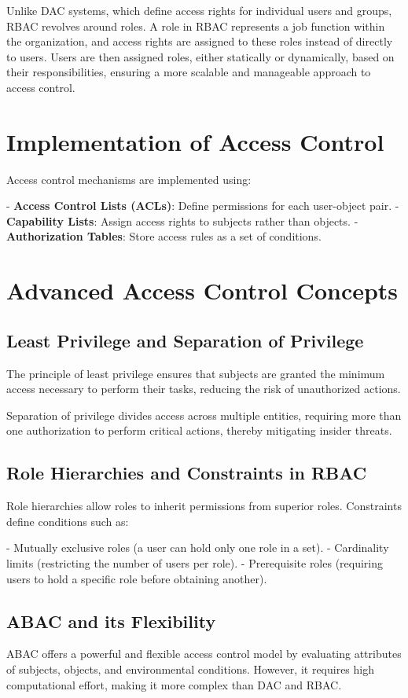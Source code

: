 Unlike DAC systems, which define access rights for individual users
and groups, RBAC revolves around roles. A role in RBAC represents a
job function within the organization, and access rights are assigned
to these roles instead of directly to users. Users are then assigned
roles, either statically or dynamically, based on their
responsibilities, ensuring a more scalable and manageable approach to
access control.

\section{Implementation of Access Control}
Access control mechanisms are implemented using:

- \textbf{Access Control Lists (ACLs)}: Define permissions for each user-object
pair.
- \textbf{Capability Lists}: Assign access rights to subjects rather than
objects.
- \textbf{Authorization Tables}: Store access rules as a set of conditions.

\section{Advanced Access Control Concepts}
\subsection{Least Privilege and Separation of Privilege}
The principle of least privilege ensures that subjects are granted the minimum
access necessary to perform their tasks, reducing the risk of unauthorized
actions.

Separation of privilege divides access across multiple entities, requiring more
than one authorization to perform critical actions, thereby mitigating insider
threats.

\subsection{Role Hierarchies and Constraints in RBAC}
Role hierarchies allow roles to inherit permissions from superior roles.
Constraints define conditions such as:

- Mutually exclusive roles (a user can hold only one role in a set).
- Cardinality limits (restricting the number of users per role).
- Prerequisite roles (requiring users to hold a specific role before obtaining
another).

\subsection{ABAC and its Flexibility}
ABAC offers a powerful and flexible access control model by evaluating
attributes of subjects, objects, and environmental conditions. However, it
requires high computational effort, making it more complex than DAC and RBAC.

